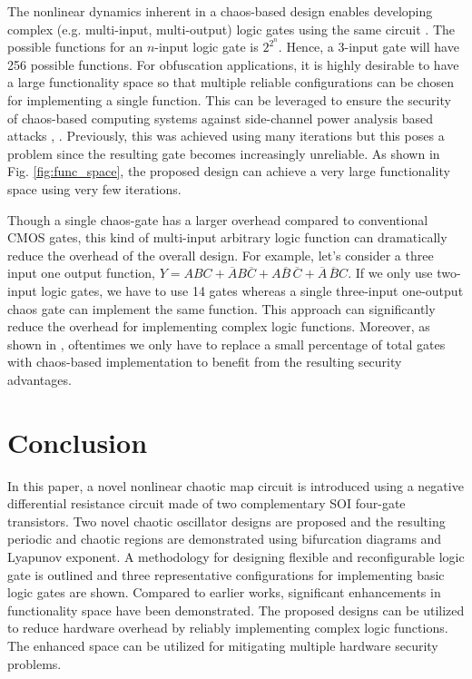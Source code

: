 \documentclass[conference]{IEEEtran}
\begin{document}
The nonlinear dynamics inherent in a chaos-based design enables developing complex (e.g. multi-input, multi-output) logic gates  using the same circuit \cite{hasan2020chaos}. The possible functions for an $n$-input logic gate is $2^{2^n}$. Hence, a 3-input gate will have 256 possible functions. For obfuscation applications, it is highly desirable to have a large functionality space so that multiple reliable configurations can be chosen for implementing a single function. This can be leveraged to ensure the security of chaos-based computing systems against side-channel power analysis based attacks \cite{hasan2020chaos}, \cite {8383903}. Previously, this was achieved using many iterations but this poses a problem since the resulting gate becomes increasingly unreliable. As shown in Fig. \ref{fig:func_space}, the proposed design can achieve a very large functionality space using very few iterations. 

Though a single chaos-gate has a larger overhead compared to conventional CMOS gates, this kind of multi-input arbitrary logic function can dramatically reduce the overhead of the overall design. For example, let's consider a three input one output function, $Y=ABC+ \overline{A}B\overline{C}+A\overline{B}\, \overline{C}  + \overline{A}\,\overline{B}C.$ If we only use two-input logic gates, we have to use 14 gates whereas a single three-input one-output chaos gate can implement the same function. This approach can significantly reduce the overhead for implementing complex logic functions. Moreover, as shown in \cite {8383903}, oftentimes we only have to replace a small percentage of total gates with chaos-based implementation to benefit from the resulting security advantages.   


\section{Conclusion}
In this paper, a novel nonlinear chaotic map circuit is introduced using a negative differential resistance circuit made of two complementary SOI four-gate transistors. Two novel chaotic oscillator designs are proposed and %
the resulting periodic and chaotic regions are demonstrated using bifurcation diagrams and Lyapunov exponent. A methodology for designing flexible and reconfigurable logic gate is outlined and three representative configurations for implementing basic logic gates are shown. Compared to earlier works, significant enhancements in functionality space have been demonstrated. The proposed designs can be utilized to reduce hardware overhead by reliably implementing complex logic functions. The enhanced space can be utilized for mitigating multiple hardware security problems. %
\label{sec_con}
\end{document}
